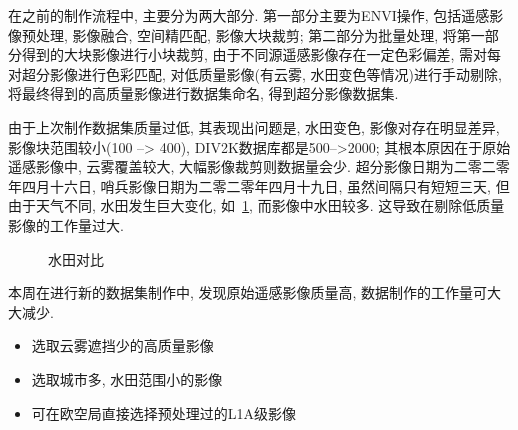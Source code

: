在之前的制作流程中, 主要分为两大部分. 第一部分主要为ENVI操作, 包括遥感影像预处理, 影像融合, 空间精匹配, 影像大块裁剪; 第二部分为批量处理, 将第一部分得到的大块影像进行小块裁剪, 由于不同源遥感影像存在一定色彩偏差, 需对每对超分影像进行色彩匹配, 对低质量影像(有云雾, 水田变色等情况)进行手动剔除, 将最终得到的高质量影像进行数据集命名, 得到超分影像数据集. 

由于上次制作数据集质量过低, 其表现出问题是, 水田变色, 影像对存在明显差异, 影像块范围较小(100 --> 400), DIV2K数据库都是500-->2000; 其根本原因在于原始遥感影像中, 云雾覆盖较大, 大幅影像裁剪则数据量会少. 超分影像日期为二零二零年四月十六日, 哨兵影像日期为二零二零年四月十九日, 虽然间隔只有短短三天, 但由于天气不同, 水田发生巨大变化, 如~\ref{fig:0202}, 而影像中水田较多. 这导致在剔除低质量影像的工作量过大. 

\begin{figure}[!htbp]
    \centering
    \quad
    \caption{水田对比}
    \label{fig:0202}
\end{figure}

本周在进行新的数据集制作中, 发现原始遥感影像质量高, 数据制作的工作量可大大减少.
\begin{itemize}
    \item 选取云雾遮挡少的高质量影像
    \item 选取城市多, 水田范围小的影像
    \item 可在欧空局直接选择预处理过的L1A级影像
\end{itemize}

